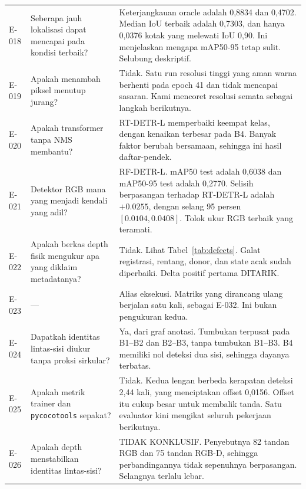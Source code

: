 \documentclass[preprint,12pt]{elsarticle}
\newcommand{\E}[1]{E-#1}
\newcommand{\mAP}{mAP}
\begin{document}
\begin{longtable}{L{0.07\textwidth}L{0.28\textwidth}L{0.55\textwidth}}
\E{018} & Seberapa jauh lokalisasi dapat mencapai pada kondisi terbaik? &
Keterjangkauan oracle adalah 0,8834 dan 0,4702. Median IoU terbaik adalah
0,7303, dan hanya 0,0376 kotak yang melewati IoU 0,90. Ini menjelaskan mengapa
\mAP50-95 tetap sulit. Selubung deskriptif.\\

\E{019} & Apakah menambah piksel menutup jurang? & Tidak. Satu run resolusi
tinggi yang aman warna berhenti pada epoch 41 dan tidak mencapai sasaran. Kami
mencoret resolusi semata sebagai langkah berikutnya.\\

\E{020} & Apakah transformer tanpa NMS membantu? & RT-DETR-L memperbaiki keempat
kelas, dengan kenaikan terbesar pada B4. Banyak faktor berubah bersamaan,
sehingga ini hasil daftar-pendek.\\

\E{021} & Detektor RGB mana yang menjadi kendali yang adil? & RF-DETR-L. \mAP50
test adalah 0,6038 dan \mAP50-95 test adalah 0,2770. Selisih berpasangan
terhadap RT-DETR-L adalah $+0.0255$, dengan selang 95 persen
$[0.0104, 0.0408]$. Tolok ukur RGB terbaik yang teramati.\\

\E{022} & Apakah berkas depth fisik mengukur apa yang diklaim metadatanya? &
Tidak. Lihat Tabel~\ref{tab:defects}. Galat registrasi, rentang, donor, dan
state acak sudah diperbaiki. Delta positif pertama DITARIK.\\

\E{023} & --- & Alias eksekusi. Matriks yang dirancang ulang berjalan satu kali,
sebagai \E{032}. Ini bukan pengukuran kedua.\\

\E{024} & Dapatkah identitas lintas-sisi diukur tanpa proksi sirkular? & Ya,
dari graf anotasi. Tumbukan terpusat pada B1--B2 dan B2--B3, tanpa tumbukan
B1--B3. B4 memiliki nol deteksi dua sisi, sehingga dayanya terbatas.\\

\E{025} & Apakah metrik trainer dan \texttt{pycocotools} sepakat? & Tidak. Kedua
lengan berbeda kerapatan deteksi 2,44 kali, yang menciptakan offset 0,0156.
Offset itu cukup besar untuk membalik tanda. Satu evaluator kini mengikat
seluruh pekerjaan berikutnya.\\

\E{026} & Apakah depth menstabilkan identitas lintas-sisi? & TIDAK KONKLUSIF.
Penyebutnya 82 tandan RGB dan 75 tandan RGB-D, sehingga perbandingannya tidak
sepenuhnya berpasangan. Selangnya terlalu lebar.\\


\end{longtable}
\end{document}
